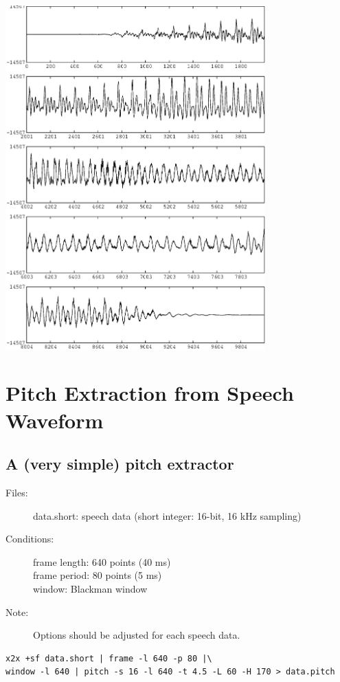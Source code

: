 \documentclass[a4paper,10pt]{article}
\begin{document}
\includegraphics[width=10cm]{data.bcut.gwave.eps}

\section{Pitch Extraction from Speech Waveform}

\subsection{A (very simple) pitch extractor}

\begin{description}
\item[Files:]
  data.short: speech data (short integer: 16-bit, 16 kHz sampling)\\
\item[Conditions:]
  frame length: 640 points (40 ms)\\
  frame period: 80 points (5 ms)\\
  window: Blackman window
\item[Note:]
  Options should be adjusted for each speech data.
\end{description}

\begin{verbatim}
x2x +sf data.short | frame -l 640 -p 80 |\
window -l 640 | pitch -s 16 -l 640 -t 4.5 -L 60 -H 170 > data.pitch
\end{verbatim}
\end{document}
